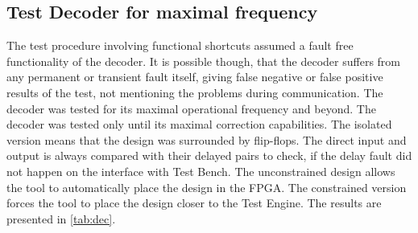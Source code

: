 \subsection{Test Decoder for maximal frequency}

The test procedure involving functional shortcuts assumed a fault free functionality of the decoder. It is possible though, that the decoder suffers from any permanent or transient fault itself, giving false negative or false positive results of the test, not mentioning the problems during communication. The decoder was tested for its maximal operational frequency and beyond. The decoder was tested only until its maximal correction capabilities. The isolated version means that the design was surrounded by flip-flops. The direct input and output is always compared with their delayed pairs to check, if the delay fault did not happen on the interface with Test Bench. The unconstrained design allows the tool to automatically place the design in the FPGA. The constrained version forces the tool to place the design closer to the Test Engine. The results are presented in \autoref{tab:dec}.

